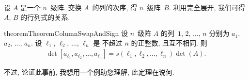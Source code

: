 \documentclass[../libro.tex]{subfiles}
\begin{document}
\maldevigalegajxo

设 \(A\) 是一个 \(n\)~级阵.
交换 \(A\)~的列的次序, 得 \(n\)~级阵~\(B\).
利用完全展开, 我们可得 \(A\), \(B\) 的行列式的关系.

\begin{restatable}{theorem}{TheoremColumnSwapAndSign}
    设 \(n\)~级阵 \(A\) 的列~\(1\), \(2\), \(\dots\), \(n\)
    分别为 \(a_1\), \(a_2\), \(\dots\), \(a_n\).
    设 \(\ell_1\), \(\ell_2\), \(\dots\), \(\ell_n\) 是%
    不超过 \(n\) 的正整数,
    且互不相同.
    则
    \begin{align*}
        \det {[a_{\ell_1}, a_{\ell_2}, \dots, a_{\ell_n}]}
        = s(\ell_1, \ell_2, \dots, \ell_n) \det {(A)}.
    \end{align*}
\end{restatable}

不过, 论证此事前, 我想用一个例助您理解,
此定理在说何.
\end{document}
